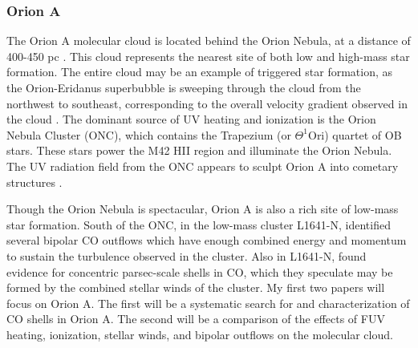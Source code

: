 \subsubsection{Orion A}\label{sec:orion}
The Orion A molecular cloud is located behind the Orion Nebula, at a distance of 400-450 pc \cite{Menten07}. This cloud represents the nearest site of both low and high-mass star formation. The entire cloud may be an example of triggered star formation, as the Orion-Eridanus superbubble is sweeping through the cloud from the northwest to southeast, corresponding to the overall velocity gradient observed in the cloud \cite{Bally08}. The dominant source of UV heating and ionization is the Orion Nebula Cluster (ONC), which contains the Trapezium (or $\Theta^1$Ori) quartet of OB stars. These stars power the M42 HII region and illuminate the Orion Nebula. The UV radiation field from the ONC appears to sculpt Orion A into cometary structures \cite{Bally08}.

Though the Orion Nebula is spectacular, Orion A is also a rich site of low-mass star formation. South of the ONC, in the low-mass cluster L1641-N, \citet{Stanke_2007} identified several bipolar CO outflows which have enough combined energy and momentum to sustain the turbulence observed in the cluster. Also in L1641-N, \citet{Nakamura_2012} found evidence for concentric parsec-scale shells in CO, which they speculate may be formed by the combined stellar winds of the cluster. My first two papers will focus on Orion A. The first will be a systematic search for and characterization of CO shells in Orion A. The second will be a comparison of the effects of FUV heating, ionization, stellar winds, and bipolar outflows on the molecular cloud.